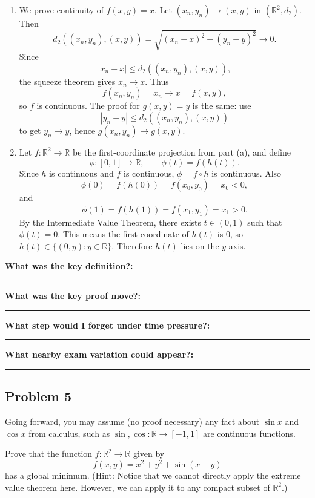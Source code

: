 \documentclass[12pt]{article}
\newcommand{\R}{\mathbb{R}}
\newcommand{\writespace}[1]{\vspace*{#1}}
\newcommand{\fillfieldbig}[2]{%
  \par\noindent\textbf{#1:}\par
  \writespace{#2}
  \noindent\rule{\linewidth}{0.35pt}\par\vspace{0.15in}%
}
\newenvironment{problemstatementbox}[1]{%
  \begin{tcolorbox}[
    enhanced,
    breakable,
    colback=probblue,
    colframe=blue!55!black,
    fonttitle=\bfseries,
    title={Problem Statement\hfill #1}
  ]
}{%
  \end{tcolorbox}
}
\newenvironment{solutionbox}[1]{%
  \begin{tcolorbox}[
    enhanced,
    breakable,
    colback=solgreen,
    colframe=green!45!black,
    fonttitle=\bfseries,
    title={#1}
  ]
}{%
  \end{tcolorbox}
}
\newcommand{\reflectionpage}[1]{%
  \begin{tcolorbox}[
    enhanced,
    colback=reflectcyan,
    colframe=cyan!55!black,
    fonttitle=\bfseries,
    title={Reflection \& Variation\hfill #1},
    height=8.45in
  ]
  \fillfieldbig{What was the key definition?}{1.15in}
  \fillfieldbig{What was the key proof move?}{1.15in}
  \fillfieldbig{What step would I forget under time pressure?}{1.15in}
  \fillfieldbig{What nearby exam variation could appear?}{1.35in}
  \end{tcolorbox}
}
\begin{document}
\newpage
\begin{solutionbox}{Student-Derived Solution (No official solution available yet)}
\begin{enumerate}[label=(\alph*)]
  \item We prove continuity of \(f(x,y)=x\). Let \((x_n,y_n)\to(x,y)\) in \((\R^2,d_2)\). Then
  \[
    d_2((x_n,y_n),(x,y))
    =
    \sqrt{(x_n-x)^2+(y_n-y)^2}\to0.
  \]
  Since
  \[
    |x_n-x|\le d_2((x_n,y_n),(x,y)),
  \]
  the squeeze theorem gives \(x_n\to x\). Thus
  \[
    f(x_n,y_n)=x_n\to x=f(x,y),
  \]
  so \(f\) is continuous. The proof for \(g(x,y)=y\) is the same: use
  \[
    |y_n-y|\le d_2((x_n,y_n),(x,y))
  \]
  to get \(y_n\to y\), hence \(g(x_n,y_n)\to g(x,y)\).

  \item Let \(f:\R^2\to\R\) be the first-coordinate projection from part (a), and define
  \[
    \phi:[0,1]\to\R,
    \qquad
    \phi(t)=f(h(t)).
  \]
  Since \(h\) is continuous and \(f\) is continuous, \(\phi=f\circ h\) is continuous. Also
  \[
    \phi(0)=f(h(0))=f(x_0,y_0)=x_0<0,
  \]
  and
  \[
    \phi(1)=f(h(1))=f(x_1,y_1)=x_1>0.
  \]
  By the Intermediate Value Theorem, there exists \(t\in(0,1)\) such that \(\phi(t)=0\). This means the first coordinate of \(h(t)\) is \(0\), so \(h(t)\in\{(0,y):y\in\R\}\). Therefore \(h(t)\) lies on the \(y\)-axis.
\end{enumerate}
\end{solutionbox}

\newpage
\reflectionpage{Homework 12, Problem 4}

\newpage
\subsection{Problem 5}

\begin{problemstatementbox}{Homework 12, Problem 5}
Going forward, you may assume (no proof necessary) any fact about \(\sin x\) and \(\cos x\) from calculus, such as \(\sin,\cos:\R\to[-1,1]\) are continuous functions.

Prove that the function \(f:\R^2\to\R\) given by
\[
  f(x,y)=x^2+y^2+\sin(x-y)
\]
has a global minimum. (Hint: Notice that we cannot directly apply the extreme value theorem here. However, we can apply it to any compact subset of \(\R^2\).)
\end{problemstatementbox}
\end{document}
